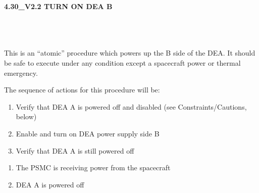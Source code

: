 \documentclass[11pt]{article}
\begin{document}
%
%
%
\newcommand{\be}{\begin{enumerate}}
\newcommand{\ee}{\end{enumerate}}
\newcommand{\bc}{\begin{center}}
\newcommand{\ec}{\end{center}}
\newcommand{\bi}{\begin{itemize}}
\newcommand{\ei}{\end{itemize}}
\newcommand{\bd}{\begin{description}}
\newcommand{\ed}{\end{description}}
\newcommand{\bt}{\begin{tabbing}}
\newcommand{\et}{\end{tabbing}}
\newcommand{\eg}{{\it e.g.~}}
\newcommand{\ie}{{\it i.e.~}}
\newcommand{\ul}{\underline}
\newcommand{\axaf}{{\em AXAF}}

\def\la{\hbox{\rlap{$<$}\lower0.5ex\hbox{$\sim$}\ }}


\large
\centerline {\bf 4.30\_V2.2 TURN ON DEA B  }
\vspace{0.25in}

\normalsize
{}\\
 \\


 \\
\normalsize
This is an ``atomic'' procedure which  powers up the B side of the DEA.
It should be safe to execute under any condition except a spacecraft
power or thermal emergency.

\noindent The sequence of actions for this procedure will be:
\be
\item Verify that DEA A is powered off and disabled (see Constraints/Cautions, below)
\vspace{-0.10in}
\item Enable and turn on DEA power supply side B
\vspace{-0.10in}
\item Verify that DEA A is still powered off
\ee

\vspace{0.15in}
\normalsize
{}
\normalsize
\be
\item The PSMC is receiving power from the spacecraft
\vspace{-0.10in}
\item DEA A is powered off
\ee
\end{document}
